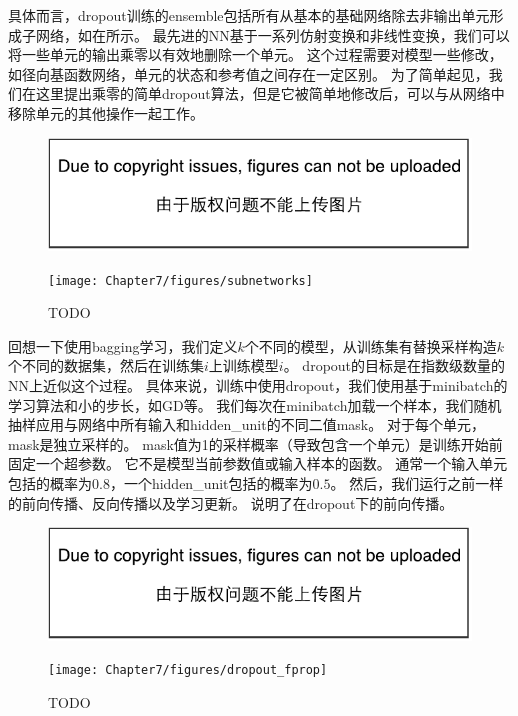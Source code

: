 具体而言，\gls{dropout}训练的\gls{ensemble}包括所有从基本的基础网络除去非输出单元形成子网络，如在所示。
最先进的\gls{NN}基于一系列仿射变换和非线性变换，我们可以将一些单元的输出乘零以有效地删除一个单元。
这个过程需要对模型一些修改，如径向基函数网络，单元的状态和参考值之间存在一定区别。
为了简单起见，我们在这里提出乘零的简单\gls{dropout}算法，但是它被简单地修改后，可以与从网络中移除单元的其他操作一起工作。
\begin{figure}[!htb]
\ifOpenSource
\centerline{\includegraphics{figure.pdf}}
\else
\centerline{\texttt{[image: Chapter7/figures/subnetworks]}}
\fi
\caption{TODO}
\label{fig:chap7_subnetworks}
\end{figure}


回想一下使用\gls{bagging}学习，我们定义$k$个不同的模型，从训练集有替换采样构造$k$个不同的数据集，然后在训练集$i$上训练模型$i$。
\gls{dropout}的目标是在指数级数量的\gls{NN}上近似这个过程。
具体来说，训练中使用\gls{dropout}，我们使用基于\gls{minibatch}的学习算法和小的步长，如\gls{GD}等。
我们每次在\gls{minibatch}加载一个样本，我们随机抽样应用与网络中所有输入和\gls{hidden_unit}的不同二值\gls{mask}。
对于每个单元，\gls{mask}是独立采样的。
\gls{mask}值为1的采样概率（导致包含一个单元）是训练开始前固定一个超参数。
它不是模型当前参数值或输入样本的函数。
通常一个输入单元包括的概率为$0.8$，一个\gls{hidden_unit}包括的概率为$0.5$。
然后，我们运行之前一样的前向传播、反向传播以及学习更新。
说明了在\gls{dropout}下的前向传播。
\begin{figure}[!htb]
\ifOpenSource
\centerline{\includegraphics{figure.pdf}}
\else
\centerline{\texttt{[image: Chapter7/figures/dropout\_fprop]}}
\fi
\caption{TODO}
\label{fig:chap7_dropout_fprop}
\end{figure}

